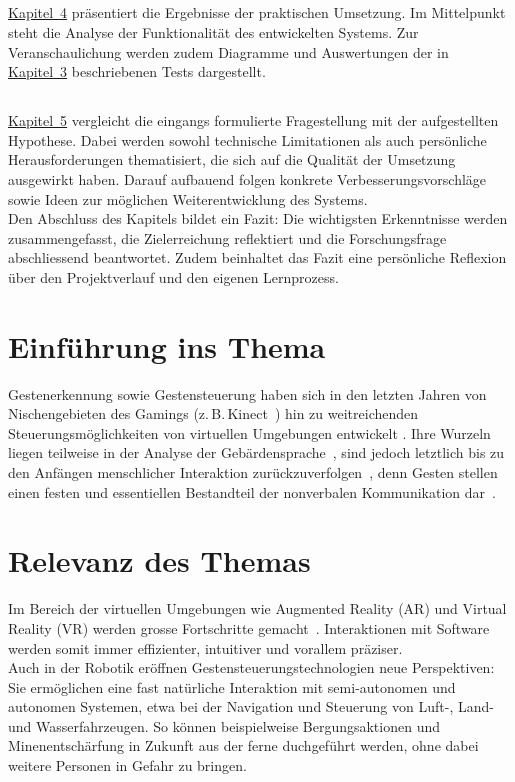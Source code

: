 \subsection{\chapFour}
\hyperref[sec:kapitel4]{Kapitel~4} präsentiert die Ergebnisse der praktischen Umsetzung.
Im Mittelpunkt steht die Analyse der Funktionalität des entwickelten Systems.
Zur Veranschaulichung werden zudem Diagramme und Auswertungen der in \hyperref[sec:kapitel3]{Kapitel~3} beschriebenen Tests dargestellt.

\subsection{\chapFive}
\hyperref[sec:kapitel5]{Kapitel~5} vergleicht die eingangs formulierte Fragestellung mit der aufgestellten Hypothese.
Dabei werden sowohl technische Limitationen als auch persönliche Herausforderungen thematisiert, die sich auf die Qualität der Umsetzung ausgewirkt haben.
Darauf aufbauend folgen konkrete Verbesserungsvorschläge sowie Ideen zur möglichen Weiterentwicklung des Systems.\\[2pt]
Den Abschluss des Kapitels bildet ein Fazit: Die wichtigsten Erkenntnisse werden zusammengefasst, die Zielerreichung reflektiert und die Forschungsfrage abschliessend beantwortet.
Zudem beinhaltet das Fazit eine persönliche Reflexion über den Projektverlauf und den eigenen Lernprozess.

\section{Einführung ins Thema}
Gestenerkennung sowie Gestensteuerung haben sich in den letzten Jahren von Nischengebieten des Gamings (z.\,B.\,Kinect~\cite{Wiki:Kinect}) hin zu weitreichenden Steuerungsmöglichkeiten von virtuellen Umgebungen entwickelt \cite{RG:GestureRecognition}.
Ihre Wurzeln liegen teilweise in der Analyse der Gebärdensprache~\cite{Wiki:Gestenerkennung}, sind jedoch letztlich bis zu den Anfängen menschlicher Interaktion zurückzuverfolgen~\cite{RG:Gesten}, denn Gesten stellen einen festen und essentiellen Bestandteil der nonverbalen Kommunikation dar~\cite[10]{Hobmair:Psy}.

\section{Relevanz des Themas}
Im Bereich der virtuellen Umgebungen wie Augmented Reality (AR) und Virtual Reality (VR) werden grosse Fortschritte gemacht~\cite{SD:VR}.
Interaktionen mit Software werden somit immer effizienter, intuitiver und vorallem präziser.\\[2pt]
Auch in der Robotik eröffnen Gestensteuerungstechnologien neue Perspektiven: Sie ermöglichen eine fast natürliche Interaktion mit semi-autonomen und autonomen Systemen, etwa bei der Navigation und Steuerung von Luft-, Land- und Wasserfahrzeugen.
So können beispielweise Bergungsaktionen und Minenentschärfung in Zukunft aus der ferne duchgeführt werden, ohne dabei weitere Personen in Gefahr zu bringen.

